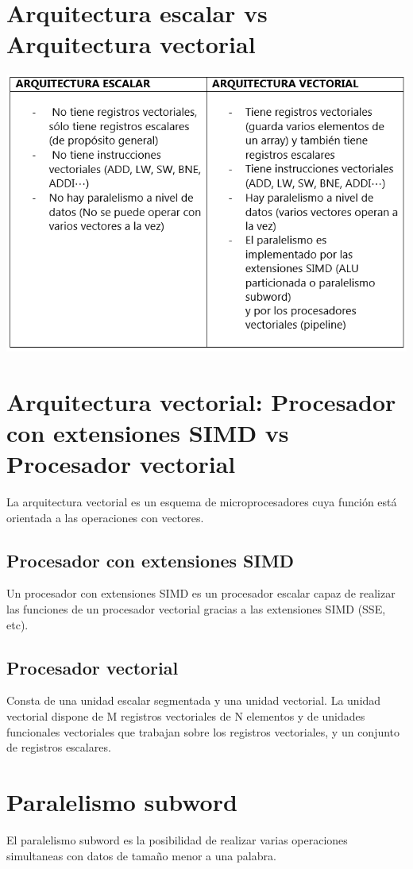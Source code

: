 \documentclass[11pt,letterpaper]{article}
\begin{document}
\section{Arquitectura escalar vs Arquitectura vectorial}
\begin{center}
	\includegraphics[scale=0.9]{EscalarVectorial.png}
\end{center}

\section{Arquitectura vectorial: Procesador con extensiones SIMD vs Procesador vectorial}
\noindent
La arquitectura vectorial es un esquema de microprocesadores cuya función está orientada a las operaciones con vectores.
\subsection{Procesador con extensiones SIMD}
\noindent
Un procesador con extensiones SIMD es un procesador escalar capaz de realizar las funciones de un procesador vectorial gracias a las extensiones SIMD (SSE, etc).
\subsection{Procesador vectorial}
\noindent
 Consta de una unidad escalar segmentada y una unidad vectorial. La unidad vectorial dispone de M registros vectoriales de N elementos y de unidades funcionales vectoriales que trabajan sobre los registros vectoriales, y un conjunto de registros escalares.

\section{Paralelismo subword}
\noindent
El paralelismo subword es la posibilidad de realizar varias operaciones simultaneas con datos de tamaño menor a una palabra.
\end{document}
